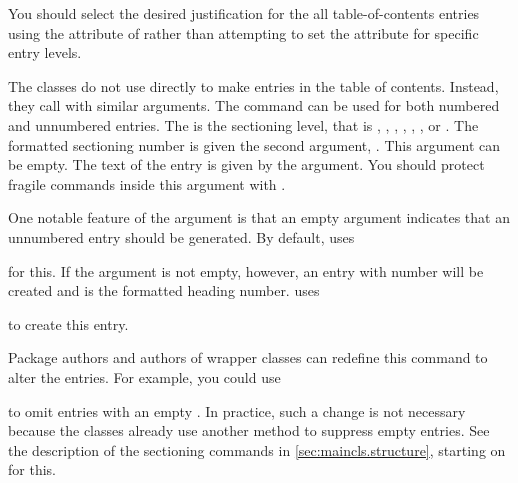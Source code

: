 You should select the desired justification for the all table-of-contents
entries using the  attribute of 
rather than attempting to set the attribute for specific entry levels.%
\EndIndexGroup


\begin{Declaration}
\end{Declaration}
The \KOMAScript{} classes do not use
%
 directly to make entries in the table of
contents. Instead, they call  with similar
arguments. The command can be used for both numbered and unnumbered entries.
The  is the sectioning level, that is ,
, , ,
, , or . The
formatted sectioning number is given the second argument, . This
argument can be empty. The text of the entry is given by the 
argument. You should protect fragile commands inside this argument with
.

One notable feature of the  argument is that an empty argument
indicates that an unnumbered entry should be generated. By default,
\KOMAScript{} uses
\begin{quote}
\end{quote}
for this. If the argument is not empty, however, an entry with number
will be created and  is the formatted heading
number. \KOMAScript{} uses
\begin{quote}\raggedright
\end{quote}
to create this entry.

Package authors and authors of wrapper classes can redefine this command to
alter the entries. For example, you could use
\begin{lstcode}
  \renewcommand{\addtocentrydefault}[3]{%
    \Ifstr{#3}{}{%
      \Ifstr{#2}{}{%
        \addcontentsline{toc}{#1}{#3}%
      }{%
        \addcontentsline{toc}{#1}{\protect\numberline{#2}#3}%
      }%
    }%
  }%
\end{lstcode}
to omit entries with an empty . In practice,
such a change is not necessary because the \KOMAScript{} classes already use
another method to suppress empty entries. See the description of the
sectioning commands in \autoref{sec:maincls.structure}, starting on
 for this.%
%
\EndIndexGroup


